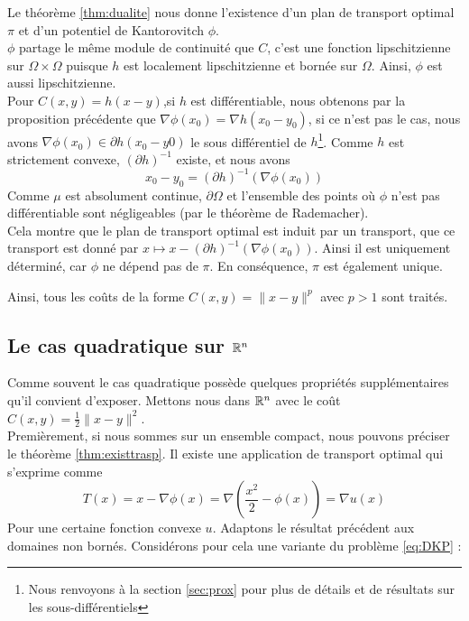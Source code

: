 \documentclass[a4paper,12pt]{article}
\begin{document}
\begin{preuve}
Le théorème \ref{thm:dualite} nous donne l'existence d'un plan de transport optimal $\pi$ et d'un potentiel de Kantorovitch $\phi$.\\

$\phi$ partage le même module de continuité que $C$, c'est une fonction lipschitzienne sur $\Omega\times\Omega$ puisque $h$ est localement lipschitzienne et bornée sur $\Omega$. Ainsi, $\phi$ est aussi lipschitzienne.\\

Pour $C(x,y) = h(x-y)$,si $h$ est différentiable, nous obtenons par la proposition précédente que $\nabla\phi (x_0)=\nabla h(x_0-y_0)$, si ce n'est pas le cas, nous avons $\nabla\phi(x_0)\in\partial h(x_0-y0)$ le sous différentiel de $h$\footnote{Nous renvoyons à la section \ref{sec:prox} pour plus de détails et de résultats sur les sous-différentiels}. Comme $h$ est strictement convexe, $(\partial h)^{-1}$ existe, et nous avons 
$$
x_0-y_0=(\partial h)^{-1}(\nabla\phi(x_0))
$$
Comme $\mu$ est absolument continue, $\partial\Omega$ et l'ensemble des points où $\phi$ n'est pas différentiable sont négligeables (par le théorème de Rademacher). \\

Cela montre que le plan de transport optimal est induit par un transport, que ce transport est donné par $x\mapsto x -(\partial h)^{-1}(\nabla\phi(x_0))$. Ainsi il est uniquement déterminé, car $\phi$ ne dépend pas de $\pi$. En conséquence, $\pi$ est également unique. 
\end{preuve}
Ainsi, tous les coûts de la forme $C(x,y) =\|x-y\|^p$ avec $p>1$ sont traités. 


\subsection{Le cas quadratique sur $\mathbb{R}^n$}
Comme souvent le cas quadratique possède quelques propriétés supplémentaires qu'il convient d'exposer. Mettons nous dans $\mathbb{R}^n $ avec le coût $C(x,y)=\frac{1}{2}\|x-y\|^2$.\\
Premièrement, si nous sommes sur un ensemble compact, nous pouvons préciser le théorème \eqref{thm:existtrasp}. Il existe une application de transport optimal qui s'exprime comme 
$$
T(x) = x -\nabla\phi(x) = \nabla\left(\frac{x^2}{2}-\phi(x)\right) = \nabla u(x)
$$
Pour une certaine fonction convexe $u$. Adaptons le résultat précédent aux domaines non bornés. Considérons pour cela une variante du problème \eqref{eq:DKP} : \\
\end{document}
